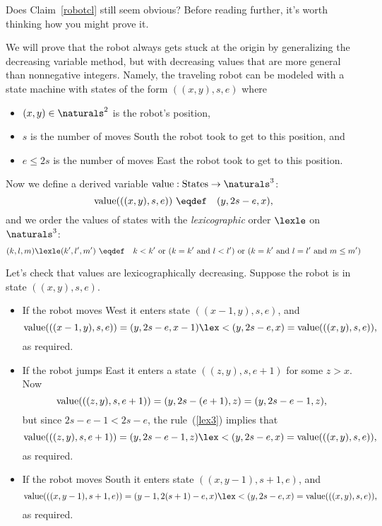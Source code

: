 Does Claim~\ref{robotcl} still seem obvious?  Before reading further, it's
worth thinking how you might prove it.

\iffalse
First give simple proof using Least Num Principle, first on number of
South moves to show robot reaches row 0, then number of East moves in row
0, then number of West moves in row 0.  Then segue into well-founded
decreasing variables.
\fi

We will prove that the robot always gets stuck at the origin by
generalizing the decreasing variable method, but with decreasing values
that are more general than nonnegative integers.  Namely, the traveling robot
can be modeled with a state machine with states of the form $((x,y),s,e)$
where
\begin{itemize}

\item $(x,y) \in \naturals^2$ is the robot's position,

\item $s$ is the number of moves South the robot took to get to this
position, and

\item $e \le 2s$ is the number of moves East the robot took to get to this
position. 

\end{itemize}

Now we define a derived variable $\vl:\text{States}\to \naturals^3$:
\[
\vl(((x,y),s,e)) \ \eqdef\quad (y,2s-e,x),
\]
and we order the values of states with the \emph{lexicographic} order
$\lexle$ on $\naturals^3$:
\begin{equation}\label{lex3}
(k,l,m) \lexle (k',l',m') \ \eqdef\quad k < k' \text{ or } (k=k' \text{
and } l < l') \text{ or } (k=k' \text{ and } l = l' \text{ and } m \le m')
\end{equation}

Let's check that values are lexicographically decreasing.  Suppose the
robot is in state $((x,y),s,e)$.

\begin{itemize}

\item If the robot moves West it enters state $((x-1,y),s,e)$, and
\[
\vl(((x-1,y),s,e)) = (y,2s-e,x-1) \lex< (y,2s-e,x) = \vl(((x,y),s,e)),
\]
as required.


\item If the robot jumps East it enters a state $((z,y),s,e+1)$ for some
$z>x$.  Now
\[
\text{value}(((z,y),s,e+1)) = (y,2s-(e+1),z) = (y,2s-e-1,z),
\]
but since $2s-e-1 < 2s-e$, the rule~(\ref{lex3}) implies that
\[
\vl(((z,y),s,e+1)) = (y,2s-e-1,z)  \lex< (y,2s-e,x) = \vl(((x,y),s,e)),
\]
as required.

\item If the robot moves South it enters state $((x,y-1),s+1,e)$, and
\[
\vl(((x,y-1),s+1,e)) = (y-1,2(s+1)-e,x) \lex< (y,2s-e,x) = \vl(((x,y),s,e)),
\]
as required.

\end{itemize}

